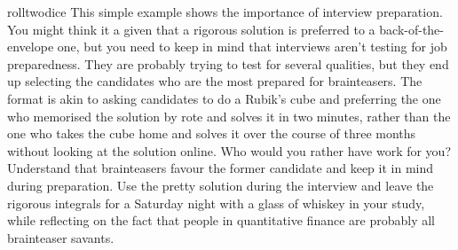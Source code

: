 \begin{answer}{rolltwodice}
This simple example shows the importance of interview preparation.
You might think it a given that a rigorous solution is preferred to a back-of-the-envelope one, but you need to keep in mind that interviews aren't testing for job preparedness.
They are probably trying to test for several qualities, but they end up selecting the candidates who are the most prepared for brainteasers.
The format is akin to asking candidates to do a Rubik's cube and preferring the one who memorised the solution by rote and solves it in two minutes, rather than the one who takes the cube home and solves it over the course of three months without looking at the solution online.
Who would you rather have work for you?
Understand that brainteasers favour the former candidate and keep it in mind during preparation.
Use the pretty solution during the interview and leave the rigorous integrals for a Saturday night with a glass of whiskey in your study, while reflecting on the fact that people in quantitative finance are probably all brainteaser savants.
\end{answer}
